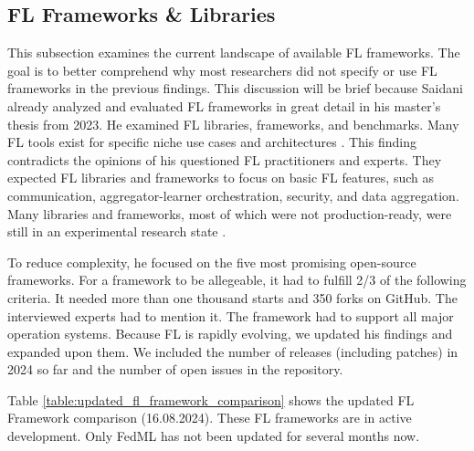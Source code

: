 \subsection{FL Frameworks \& Libraries}\label{subsection:fl_frameworks_and_libraries}

\begin{figure}[b]
    
\end{figure}

This subsection examines the current landscape of available FL frameworks.
The goal is to better comprehend why most researchers did not specify or use FL frameworks in the previous findings.
This discussion will be brief because Saidani already analyzed and evaluated FL frameworks in great detail in his master's thesis \cite{thesis:tum_fl_framework_comparison} from 2023.
He examined FL libraries, frameworks, and benchmarks.
Many FL tools exist for specific niche use cases and architectures \cite{thesis:tum_fl_framework_comparison}.
This finding contradicts the opinions of his questioned FL practitioners and experts.
They expected FL libraries and frameworks to focus on basic FL features, such as communication, aggregator-learner orchestration, security, and data aggregation.
Many libraries and frameworks, most of which were not production-ready, were still in an experimental research state \cite{thesis:tum_fl_framework_comparison}.

To reduce complexity, he focused on the five most promising open-source frameworks.
For a framework to be allegeable, it had to fulfill 2/3 of the following criteria.
It needed more than one thousand starts and 350 forks on GitHub.
The interviewed experts had to mention it.
The framework had to support all major operation systems.
Because FL is rapidly evolving, we updated his findings and expanded upon them.
We included the number of releases (including patches) in 2024 so far and the number of open issues in the repository.

Table \ref{table:updated_fl_framework_comparison} shows the updated FL Framework comparison (16.08.2024).
These FL frameworks are in active development. 
Only FedML has not been updated for several months now.

